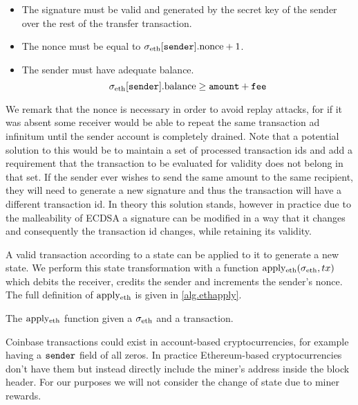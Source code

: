 \documentclass[sigconf,authordraft]{acmart}
\newcommand{\pluseq}{\texttt{\,+=\,}}
\newcommand{\minuseq}{\texttt{\,-=\,}}
\newcommand{\plusplus}{\texttt{++}}
\begin{document}
\begin{itemize}
    \item The signature must be valid and generated by the secret key of the sender over the rest of the transfer transaction.
    \item The nonce must be equal to $\sigma_\text{eth}[\texttt{sender}].\text{nonce} + 1$.
    \item The sender must have adequate balance.
    \[
        \sigma_\text{eth}[\texttt{sender}].\text{balance} \ge \texttt{amount}+\texttt{fee}
    \]
\end{itemize}

We remark that the nonce is necessary in order to avoid replay attacks, for if it was absent some receiver would be able to repeat the same transaction ad infinitum until the sender account is completely drained. Note that a potential solution to this would be to maintain a set of processed transaction ids and add a requirement that the transaction to be evaluated for validity does not belong in that set. If the sender ever wishes to send the same amount to the same recipient, they will need to generate a new signature and thus the transaction will have a different transaction id. In theory this solution stands, however in practice due to the malleability of ECDSA a signature can be modified in a way that it changes and consequently the transaction id changes, while retaining its validity.

\def\ethapply{\text{apply}\textsubscript{eth}}

A valid transaction according to a state can be applied to it to generate a new state. We perform this state transformation with a function $\ethapply(\ethstate, tx)$ which debits the receiver, credits the sender and increments the sender's nonce. The full definition of $\ethapply$ is given in \cref{alg.ethapply}.

\begin{algorithm}[H]
    \caption{\label{alg.ethapply} The $\ethapply$ function given a $\ethstate$ and a transaction.}
    \begin{algorithmic}[1]
        \Function{$\ethapply$}{$\ethstate, tx$}
            \State{$\plusplus\ethstate[tx.\sender].\nonce$}
            \State{$\ethstate[tx.\sender].\bal \minuseq tx.\amount$}
            \State{$\ethstate[tx.\receiver].\bal \pluseq tx.\amount$}
            \State\Return{$\ethstate$}
        \EndFunction
    \end{algorithmic}
\end{algorithm}

Coinbase transactions could exist in account-based cryptocurrencies, for example having a $\texttt{sender}$ field of all zeros. In practice Ethereum-based cryptocurrencies don't have them but instead directly include the miner's address inside the block header. For our purposes we will not consider the change of state due to miner rewards.
\end{document}
